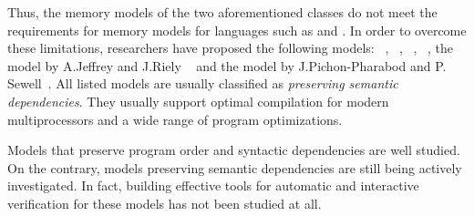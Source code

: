 

Thus, the memory models of the two aforementioned classes do not meet the requirements for memory models for languages such as \CPP and \Java.
In order to overcome these limitations, researchers have proposed the following models:
\Prm~\autocite{Kang-al:POPL17}, \Wkm~\autocite{Chakraborty-Vafeiadis:POPL19},
\MRD~\autocite{Paviotti-al:ESOP20}, \PwP~\autocite{Jagadeesan-al:OOPSLA2020}, the
model by A.Jeffrey and J.Riely ~\autocite{Jeffrey-Riely:LICS16} and the model by J.Pichon-Pharabod and P. Sewell~\autocite{PichonPharabod-Sewell:POPL16}.
All listed models are usually classified as \emph{preserving semantic dependencies}.
They usually support optimal compilation for modern multiprocessors and a wide range of program optimizations.


Models that preserve program order and syntactic dependencies are well studied. On the contrary, models preserving semantic dependencies are still being actively investigated. In fact, building effective tools for automatic and interactive verification for these models has not been studied at all.

